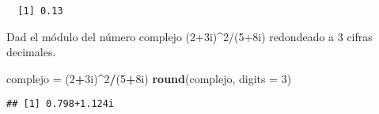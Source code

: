 \documentclass[]{article}
\newenvironment{Shaded}{\begin{snugshade}}{\end{snugshade}}
\newcommand{\DataTypeTok}[1]{\textcolor[rgb]{0.13,0.29,0.53}{#1}}
\newcommand{\DecValTok}[1]{\textcolor[rgb]{0.00,0.00,0.81}{#1}}
\newcommand{\KeywordTok}[1]{\textcolor[rgb]{0.13,0.29,0.53}{\textbf{#1}}}
\newcommand{\NormalTok}[1]{#1}
\newcommand{\OperatorTok}[1]{\textcolor[rgb]{0.81,0.36,0.00}{\textbf{#1}}}
\newcommand{\StringTok}[1]{\textcolor[rgb]{0.31,0.60,0.02}{#1}}
\begin{document}
\begin{verbatim}
  [1] 0.13
\end{verbatim}

Dad el módulo del número complejo (2+3i)\^{}2/(5+8i) redondeado a 3
cifras decimales.

\begin{Shaded}
\begin{Highlighting}[]
\NormalTok{complejo =}\StringTok{ }\NormalTok{(}\DecValTok{2}\OperatorTok{+}\NormalTok{3i)}\OperatorTok{^}\DecValTok{2}\OperatorTok{/}\NormalTok{(}\DecValTok{5}\OperatorTok{+}\NormalTok{8i)}
\KeywordTok{round}\NormalTok{(complejo, }\DataTypeTok{digits =} \DecValTok{3}\NormalTok{)}
\end{Highlighting}
\end{Shaded}

\begin{verbatim}
## [1] 0.798+1.124i
\end{verbatim}
\end{document}
